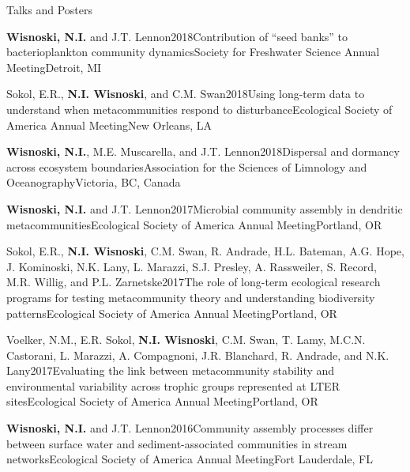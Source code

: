 \documentclass{resume} %
\begin{document}
\begin{rhangSection}{Talks and Posters}
  \begin{Presentation}{{\bf Wisnoski, N.I.} and J.T. Lennon}{2018}{Contribution of \enquote{seed banks} to bacterioplankton community dynamics}{Society for Freshwater Science Annual Meeting}{Detroit, MI}
  \end{Presentation}
  
  \begin{Presentation}{Sokol, E.R., {\bf N.I. Wisnoski}, and C.M. Swan}{2018}{Using long-term data to understand when metacommunities respond to disturbance}{Ecological Society of America Annual Meeting}{New Orleans, LA}
  \end{Presentation}

  \begin{Presentation}{{\bf Wisnoski, N.I.}, M.E. Muscarella, and J.T. Lennon}{2018}{Dispersal and dormancy across ecosystem boundaries}{Association for the Sciences of Limnology and Oceanography}{Victoria, BC, Canada}
  \end{Presentation}

  \begin{Presentation}{{\bf Wisnoski, N.I.} and J.T. Lennon}{2017}{Microbial community assembly in dendritic metacommunities}{Ecological Society of America Annual Meeting}{Portland, OR}
  \end{Presentation}
  
  \begin{Presentation}{Sokol, E.R., {\bf N.I. Wisnoski}, C.M. Swan, R. Andrade, H.L. Bateman, A.G. Hope, J. Kominoski, N.K. Lany, L. Marazzi, S.J. Presley, A. Rassweiler, S. Record, M.R. Willig, and P.L. Zarnetske}{2017}{The role of long-term ecological research programs for testing metacommunity theory and understanding biodiversity patterns}{Ecological Society of America Annual Meeting}{Portland, OR}
  \end{Presentation}
  
  \begin{Presentation}{Voelker, N.M., E.R. Sokol, {\bf N.I. Wisnoski}, C.M. Swan, T. Lamy, M.C.N. Castorani, L. Marazzi, A. Compagnoni, J.R. Blanchard, R. Andrade, and N.K. Lany}{2017}{Evaluating the link between metacommunity stability and environmental variability across trophic groups represented at LTER sites}{Ecological Society of America Annual Meeting}{Portland, OR}
  \end{Presentation}

  \begin{Presentation}{{\bf Wisnoski, N.I.} and J.T. Lennon}{2016}{Community assembly processes differ between surface water and sediment-associated communities in stream networks}{Ecological Society of America Annual Meeting}{Fort Lauderdale, FL}
  \end{Presentation}


\end{rhangSection}
\end{document}
